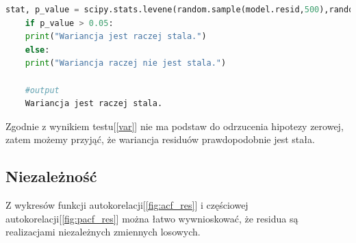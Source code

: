 \documentclass{article}
\theoremstyle{break}
\begin{document}
\begin{lstlisting}[language=Python, caption=Test Levene'a, label={var}]
	stat, p_value = scipy.stats.levene(random.sample(model.resid,500),random.sample(model.resid,500))
	if p_value > 0.05:
	print("Wariancja jest raczej stala.")
	else:
	print("Wariancja raczej nie jest stala.")
	
	#output
	Wariancja jest raczej stala.
\end{lstlisting}

Zgodnie z wynikiem testu[\ref{var}] nie ma podstaw do odrzucenia hipotezy zerowej, zatem możemy przyjąć, że wariancja residuów prawdopodobnie jest stała.

\subsection{Niezależność}
Z wykresów funkcji autokorelacji[\ref{fig:acf_res}] i częściowej autokorelacji[\ref{fig:pacf_res}] można łatwo wywnioskować, że residua są realizacjami niezależnych zmiennych losowych.
\end{document}
